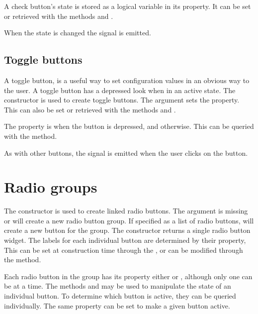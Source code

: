 A check button's state is stored as a logical variable in its
 property. It can be set or retrieved with the methods
 and
. 

When the state is changed the  signal is emitted.


\subsection{Toggle buttons}
\label{sec:ToggleButtons}

A toggle button, is a useful way to set configuration values in an
obvious way to the user.  A toggle button has a depressed look when in
an active state. The  constructor is
used to create toggle buttons. The 
argument sets the  property. This can also be set or
retrieved with the methods  and
.

The  property is  when the button is
depressed, and  otherwise. This can be queried with the
 method.

As with other buttons, the  signal is emitted when the user
clicks on the button.


\section{Radio groups}
\label{sec:RGtk2:gtkRadioButton}

The  constructor is used to create linked
radio buttons.  The argument  is
missing or  will create a new radio button group. If
specified as a list of radio buttons, will create a new button for the
group.  The constructor returns a single radio button widget.  The
labels for each individual button are determined by their 
property, This can be set at construction time through the
, or can be modified through the
 method.

Each radio button in the group has its  property either
 or , although only one can be  at a
time. The methods  and  may be used to manipulate the state of an individual button. To determine which button is active, they can be queried
individually. The same property can be set to make a given button
active.  

